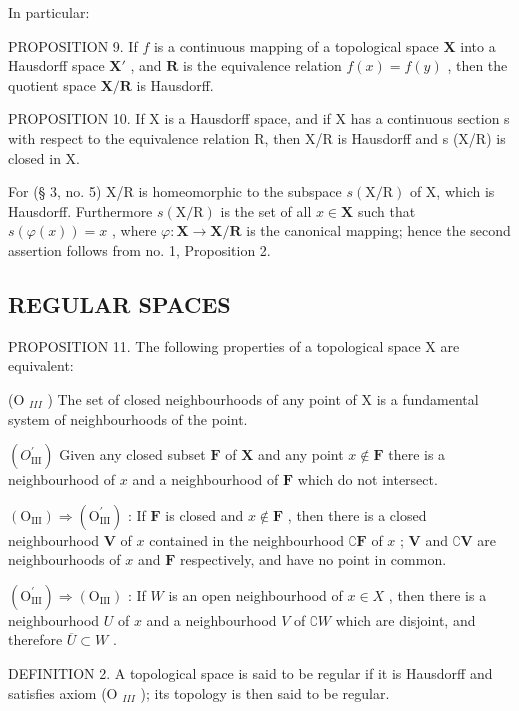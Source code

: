 In particular:

PROPOSITION 9. If \(f\) is a continuous mapping of a topological space \(\mathbf{X}\) into a Hausdorff space \(\mathbf{X}'\) , and \(\mathbf{R}\) is the equivalence relation \(f(x) = f(y)\) , then the quotient space \(\mathbf{X} / \mathbf{R}\) is Hausdorff.

PROPOSITION 10. If X is a Hausdorff space, and if X has a continuous section s with respect to the equivalence relation R, then X/R is Hausdorff and s (X/R) is closed in X.

For (§ 3, no. 5) X/R is homeomorphic to the subspace \(s(\mathrm{X}/\mathrm{R})\) of X, which is Hausdorff. Furthermore \(s(\mathrm{X}/\mathrm{R})\) is the set of all \(x \in \mathbf{X}\) such that \(s(\varphi(x)) = x\) , where \(\varphi: \mathbf{X} \to \mathbf{X}/\mathbf{R}\) is the canonical mapping; hence the second assertion follows from no. 1, Proposition 2.

\subsection{REGULAR SPACES}

PROPOSITION 11. The following properties of a topological space X are equivalent:

(O \(_{III}\) ) The set of closed neighbourhoods of any point of X is a fundamental system of neighbourhoods of the point.

\((O_{\mathrm{III}}^{\prime})\) Given any closed subset \(\mathbf{F}\) of \(\mathbf{X}\) and any point \(x \notin \mathbf{F}\) there is a neighbourhood of \(x\) and a neighbourhood of \(\mathbf{F}\) which do not intersect.

\((\mathrm{O}_{\mathrm{III}}) \Longrightarrow (\mathrm{O}_{\mathrm{III}}^{\prime})\) : If \(\mathbf{F}\) is closed and \(x \notin \mathbf{F}\) , then there is a closed neighbourhood \(\mathbf{V}\) of \(x\) contained in the neighbourhood \(\complement \mathbf{F}\) of \(x\) ; \(\mathbf{V}\) and \(\complement \mathbf{V}\) are neighbourhoods of \(x\) and \(\mathbf{F}\) respectively, and have no point in common.

\((\mathrm{O}_{\mathrm{III}}^{\prime}) \Longrightarrow (\mathrm{O}_{\mathrm{III}})\) : If \(W\) is an open neighbourhood of \(x \in X\) , then there is a neighbourhood \(U\) of \(x\) and a neighbourhood \(V\) of \(\complement W\) which are disjoint, and therefore \(\overline{U} \subset W\) .

DEFINITION 2. A topological space is said to be regular if it is Hausdorff and satisfies axiom (O \(_{III}\) ); its topology is then said to be regular.

